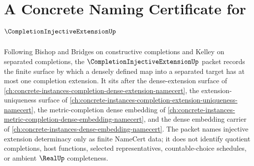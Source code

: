 \chapter{A Concrete Naming Certificate for $\CompletionInjectiveExtensionUp$}
\label{ch:concrete-instances-completion-injective-extension-namecert}

Following Bishop and Bridges on constructive completions and Kelley on separated completions, the $\CompletionInjectiveExtensionUp$ packet records the finite surface by which a densely defined map into a separated target has at most one completion extension. It sits after the dense-extension surface of \autoref{ch:concrete-instances-completion-dense-extension-namecert}, the extension-uniqueness surface of \autoref{ch:concrete-instances-completion-extension-uniqueness-namecert}, the metric-completion dense embedding of \autoref{ch:concrete-instances-metric-completion-dense-embedding-namecert}, and the dense embedding carrier of \autoref{ch:concrete-instances-dense-embedding-namecert}. The packet names injective extension determinacy only as finite NameCert data; it does not identify quotient completions, host functions, selected representatives, countable-choice schedules, or ambient $\RealUp$ completeness.

